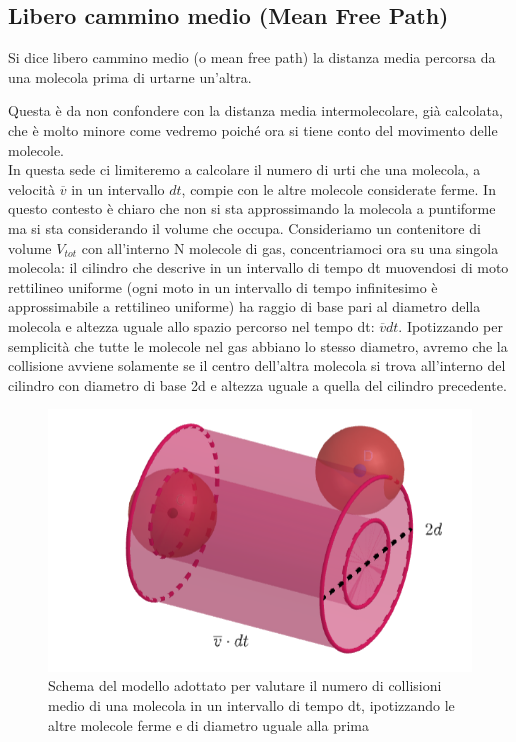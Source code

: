 \documentclass[
10pt, %
a4paper, %
oneside, %
headinclude,footinclude, %
BCOR5mm, %
]{scrartcl}
\begin{document}
\subsection{Libero cammino medio (Mean Free Path)}
\begin{definition}
	Si dice libero cammino medio (o mean free path) la distanza media percorsa da una molecola prima di urtarne un’altra. 
\end{definition}
Questa è da non confondere con la distanza media intermolecolare, già calcolata, che è molto minore come vedremo poiché ora si tiene conto del movimento delle molecole.\\
In questa sede ci limiteremo a calcolare il numero di urti che una molecola, a velocità $\overline{v}$ in un intervallo $dt$, compie con le altre molecole considerate ferme. In questo contesto è chiaro che non si sta approssimando la molecola a puntiforme ma si sta considerando il volume che occupa. Consideriamo un contenitore di volume $V_{tot}$ con all'interno N molecole di gas, concentriamoci ora su una singola molecola: il cilindro che descrive in un intervallo di tempo dt muovendosi di moto rettilineo uniforme (ogni moto in un intervallo di tempo infinitesimo è approssimabile a rettilineo uniforme) ha raggio di base pari al diametro della molecola e altezza uguale allo spazio percorso nel tempo dt: $\overline{v}dt$. Ipotizzando per semplicità che tutte le molecole nel gas abbiano lo stesso diametro, avremo che la collisione avviene solamente se il centro dell'altra molecola si trova all'interno del cilindro con diametro di base 2d e altezza uguale a quella del cilindro precedente.  
\begin{figure}[h!]
	\centering
	\includegraphics[width=0.7\linewidth]{../images/libero_cammino_medio}
	\caption{Schema del modello adottato per valutare il numero di collisioni medio di una molecola in un intervallo di tempo dt, ipotizzando le altre molecole ferme e di diametro uguale alla prima}
	\label{fig:liberocamminomedio}
\end{figure}
\end{document}
